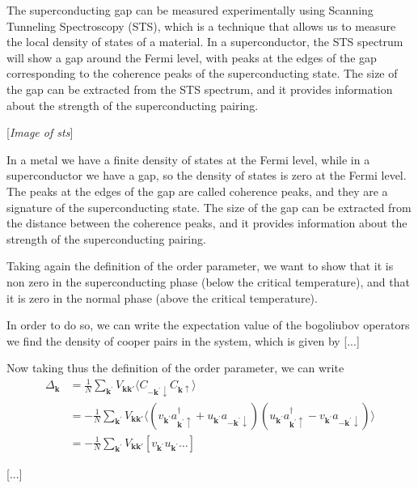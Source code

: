 \begin{example}
    The superconducting gap can be measured experimentally using Scanning Tunneling Spectroscopy (STS), which is a technique that allows us to measure the local density of states of a material. In a superconductor, the STS spectrum will show a gap around the Fermi level, with peaks at the edges of the gap corresponding to the coherence peaks of the superconducting state. The size of the gap can be extracted from the STS spectrum, and it provides information about the strength of the superconducting pairing.

        [\textit{Image of sts}]

    In a metal we have a finite density of states at the Fermi level, while in a superconductor we have a gap, so the density of states is zero at the Fermi level. The peaks at the edges of the gap are called coherence peaks, and they are a signature of the superconducting state. The size of the gap can be extracted from the distance between the coherence peaks, and it provides information about the strength of the superconducting pairing.
\end{example}

Taking again the definition of the order parameter, we want to show that it is non zero in the superconducting phase (below the critical temperature), and that it is zero in the normal phase (above the critical temperature).

In order to do so, we can write the expectation value of the bogoliubov operators we find the density of cooper pairs in the system, which is given by
    [...]

Now taking thus the definition of the order parameter, we can write
\[
    \begin{aligned}
        \Delta_{\mathbf{k}} & = \frac{1}{N} \sum_{\mathbf{k}^{\prime}} V_{\mathbf{k}\mathbf{k}'} \langle C_{-\mathbf{k}^{\prime} \downarrow} C_{\mathbf{k} \uparrow} \rangle                                                                                                                                                                                                            \\
                            & = -\frac{1}{N} \sum_{\mathbf{k}^{\prime}} V_{\mathbf{k}\mathbf{k}'} \langle (v_{\mathbf{k}^{\prime}} a_{\mathbf{k}^{\prime} \uparrow}^{\dagger} + u_{\mathbf{k}^{\prime}} a_{-\mathbf{k}^{\prime} \downarrow}) (u_{\mathbf{k}^{\prime}} a_{\mathbf{k}^{\prime} \uparrow}^{\dagger} - v_{\mathbf{k}^{\prime}} a_{-\mathbf{k}^{\prime} \downarrow}) \rangle \\
                            & = -\frac{1}{N} \sum_{\mathbf{k}^{\prime}} V_{\mathbf{k}\mathbf{k}'} \left[ v_{\mathbf{k}^{\prime}}u_{\mathbf{k}^{\prime}} \dots   \right]
    \end{aligned}
\]

[...]

